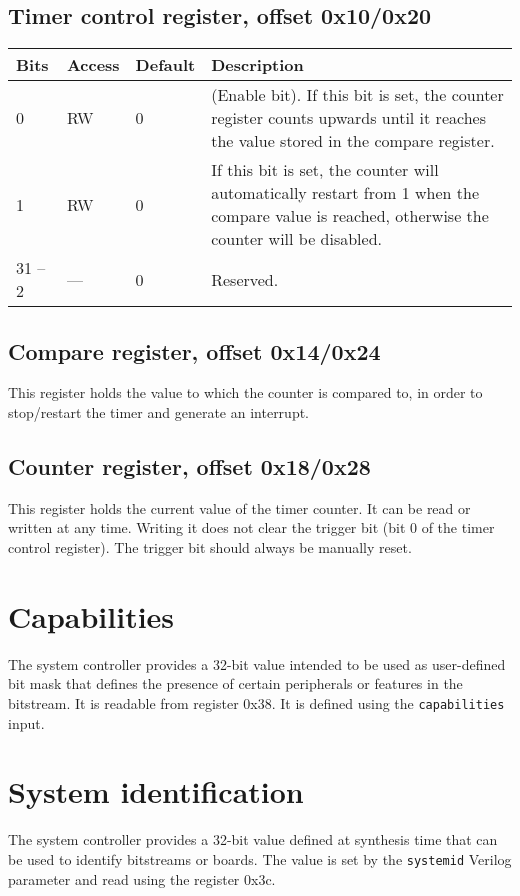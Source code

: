 \documentclass[a4paper,11pt]{article}
\begin{document}
\subsection{Timer control register, offset 0x10/0x20}
\begin{tabularx}{\textwidth}{|l|l|l|X|}
\hline
\bf Bits & \bf Access & \bf Default & \bf Description \\
\hline
0 & RW & 0 & (Enable bit). If this bit is set, the counter register counts upwards until it reaches the value stored in the compare register. \\
\hline
1 & RW & 0 & If this bit is set, the counter will automatically restart from 1 when the compare value is reached, otherwise the counter will be disabled. \\
\hline
31 -- 2 & --- & 0 & Reserved. \\
\hline
\end{tabularx}

\subsection{Compare register, offset 0x14/0x24}
This register holds the value to which the counter is compared to, in order to stop/restart the timer and generate an interrupt.

\subsection{Counter register, offset 0x18/0x28}
This register holds the current value of the timer counter. It can be read or written at any time.
Writing it does not clear the trigger bit (bit 0 of the timer control register). The trigger bit should always be manually reset.

\section{Capabilities}
The system controller provides a 32-bit value intended to be used as user-defined bit mask that defines the presence of certain peripherals or features in the bitstream. It is readable from register 0x38. It is defined  using the \verb!capabilities! input.

\section{System identification}
The system controller provides a 32-bit value defined at synthesis time that can be used to identify bitstreams or boards. The value is set by the \verb!systemid! Verilog parameter and read using the register 0x3c.
\end{document}
